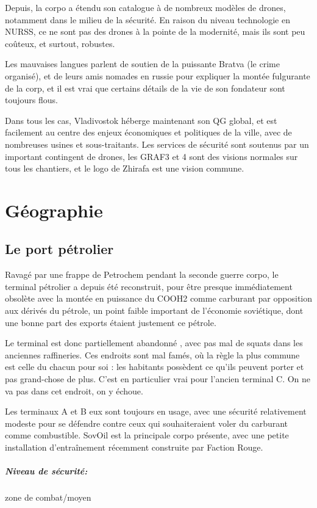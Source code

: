 \documentclass[10pt,a4paper]{book}
\begin{document}
Depuis, la corpo a étendu son catalogue à de nombreux modèles de drones, notamment dans le milieu de la sécurité. En raison du niveau technologie en NURSS, ce ne sont pas des drones à la pointe de la modernité, mais ils sont peu coûteux, et surtout, robustes.

Les mauvaises langues parlent de soutien de la puissante Bratva (le crime organisé), et de leurs amis nomades en russie pour expliquer la montée fulgurante de la corp, et il est vrai que certains détails de la vie de son fondateur sont toujours flous.

Dans tous les cas, Vladivostok héberge maintenant son QG global, et est facilement au centre des enjeux économiques et politiques de la ville, avec de nombreuses usines et sous-traitants. Les services de sécurité sont soutenus par un important contingent de drones, les GRAF3 et 4 sont des visions normales sur tous les chantiers, et le logo de Zhirafa est une vision commune.
\chapter{Géographie}
\section{Le port pétrolier}
Ravagé par une frappe de Petrochem pendant la seconde guerre corpo, le terminal pétrolier a depuis été reconstruit, pour être presque immédiatement obsolète avec la montée en puissance du COOH2 comme carburant par opposition aux dérivés du pétrole, un point faible important de l'économie soviétique, dont une bonne part des exports étaient justement ce pétrole. 

Le terminal est donc partiellement abandonné , avec pas mal de squats dans les anciennes raffineries. Ces endroits sont mal famés, où la règle la plus commune est celle du chacun pour soi : les habitants possèdent ce qu'ils peuvent porter et pas grand-chose de plus. C'est en particulier vrai pour l'ancien terminal C. On ne va pas dans cet endroit, on y échoue.

Les terminaux A et B eux sont toujours en usage, avec une sécurité relativement modeste pour se défendre contre ceux qui souhaiteraient voler du carburant comme combustible. SovOil est la principale corpo présente, avec une petite installation d'entraînement récemment construite par Faction Rouge.
\paragraph{Niveau de sécurité:} zone de combat/moyen
\end{document}
